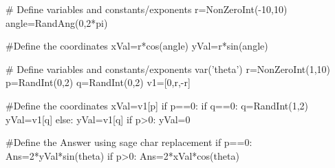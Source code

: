 
\begin{sagesilent}
# Define variables and constants/exponents
r=NonZeroInt(-10,10)
angle=RandAng(0,2*pi)

#Define the coordinates
xVal=r*cos(angle)
yVal=r*sin(angle)
\end{sagesilent}


\begin{sagesilent}
# Define variables and constants/exponents
var('theta')
r=NonZeroInt(1,10)
p=RandInt(0,2)
q=RandInt(0,2)
v1=[0,r,-r]

#Define the coordinates
xVal=v1[p]
if p==0:
   if q==0:
      q=RandInt(1,2)
      yVal=v1[q]
   else:
      yVal=v1[q]
if p>0:
   yVal=0

#Define the Answer using sage char replacement
if p==0:
   Ans=2*yVal*sin(theta)
if p>0:
   Ans=2*xVal*cos(theta)
\end{sagesilent}


